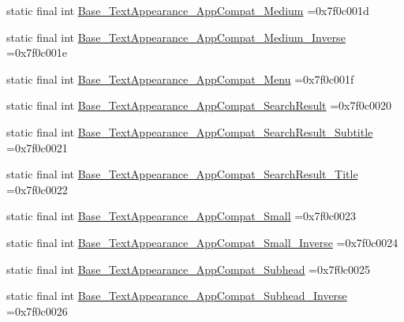 \begin{DoxyCompactItemize}
\item 
static final int \mbox{\hyperlink{classbr_1_1unb_1_1cic_1_1mp_1_1marketmaster_1_1test_1_1R_1_1style_a7a1a4a72b25130fe684637264023f863}{Base\+\_\+\+Text\+Appearance\+\_\+\+App\+Compat\+\_\+\+Medium}} =0x7f0c001d
\item 
static final int \mbox{\hyperlink{classbr_1_1unb_1_1cic_1_1mp_1_1marketmaster_1_1test_1_1R_1_1style_a3bfbb6111b79a2155cae91155f7b0864}{Base\+\_\+\+Text\+Appearance\+\_\+\+App\+Compat\+\_\+\+Medium\+\_\+\+Inverse}} =0x7f0c001e
\item 
static final int \mbox{\hyperlink{classbr_1_1unb_1_1cic_1_1mp_1_1marketmaster_1_1test_1_1R_1_1style_a513970619a0ff51ec15fd9310e9185d0}{Base\+\_\+\+Text\+Appearance\+\_\+\+App\+Compat\+\_\+\+Menu}} =0x7f0c001f
\item 
static final int \mbox{\hyperlink{classbr_1_1unb_1_1cic_1_1mp_1_1marketmaster_1_1test_1_1R_1_1style_adf1056ae69b6c60d2a7a8a3f2d01e024}{Base\+\_\+\+Text\+Appearance\+\_\+\+App\+Compat\+\_\+\+Search\+Result}} =0x7f0c0020
\item 
static final int \mbox{\hyperlink{classbr_1_1unb_1_1cic_1_1mp_1_1marketmaster_1_1test_1_1R_1_1style_a7f328c4a115c395c5a5aa3820773ca6d}{Base\+\_\+\+Text\+Appearance\+\_\+\+App\+Compat\+\_\+\+Search\+Result\+\_\+\+Subtitle}} =0x7f0c0021
\item 
static final int \mbox{\hyperlink{classbr_1_1unb_1_1cic_1_1mp_1_1marketmaster_1_1test_1_1R_1_1style_afca26a88963887aa027e392aec0ef760}{Base\+\_\+\+Text\+Appearance\+\_\+\+App\+Compat\+\_\+\+Search\+Result\+\_\+\+Title}} =0x7f0c0022
\item 
static final int \mbox{\hyperlink{classbr_1_1unb_1_1cic_1_1mp_1_1marketmaster_1_1test_1_1R_1_1style_aa13cbb3a954ccf318a73f941b078f4d4}{Base\+\_\+\+Text\+Appearance\+\_\+\+App\+Compat\+\_\+\+Small}} =0x7f0c0023
\item 
static final int \mbox{\hyperlink{classbr_1_1unb_1_1cic_1_1mp_1_1marketmaster_1_1test_1_1R_1_1style_ae0923a2431bf982ab7167c32c0cc0df3}{Base\+\_\+\+Text\+Appearance\+\_\+\+App\+Compat\+\_\+\+Small\+\_\+\+Inverse}} =0x7f0c0024
\item 
static final int \mbox{\hyperlink{classbr_1_1unb_1_1cic_1_1mp_1_1marketmaster_1_1test_1_1R_1_1style_a2e510f971e9587ef1844f2223a248814}{Base\+\_\+\+Text\+Appearance\+\_\+\+App\+Compat\+\_\+\+Subhead}} =0x7f0c0025
\item 
static final int \mbox{\hyperlink{classbr_1_1unb_1_1cic_1_1mp_1_1marketmaster_1_1test_1_1R_1_1style_af91678061f4324001d0bb2e1d071055f}{Base\+\_\+\+Text\+Appearance\+\_\+\+App\+Compat\+\_\+\+Subhead\+\_\+\+Inverse}} =0x7f0c0026

\end{DoxyCompactItemize}
